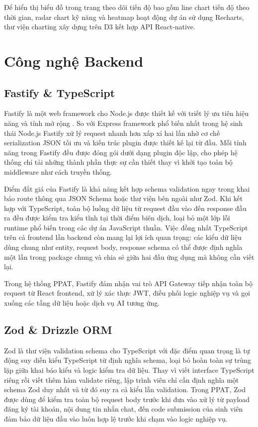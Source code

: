 \documentclass[../main.tex]{subfiles}
\begin{document}
Để hiển thị biểu đồ trong trang theo dõi tiến độ bao gồm line chart tiến độ theo thời gian, radar chart kỹ năng và heatmap hoạt động dự án sử dụng Recharts, thư viện charting xây dựng trên D3 kết hợp API React-native.

\section{Công nghệ Backend}

\subsection{Fastify \& TypeScript}

Fastify là một web framework cho Node.js được thiết kế với triết lý ưu tiên hiệu năng và tính mở rộng \cite{fastify2024docs}. So với Express framework phổ biến nhất trong hệ sinh thái Node.js Fastify xử lý request nhanh hơn xấp xỉ hai lần nhờ cơ chế serialization JSON tối ưu và kiến trúc plugin được thiết kế lại từ đầu. Mỗi tính năng trong Fastify đều được đóng gói dưới dạng plugin độc lập, cho phép hệ thống chỉ tải những thành phần thực sự cần thiết thay vì khởi tạo toàn bộ middleware như cách truyền thống.

Điểm đắt giá của Fastify là khả năng kết hợp schema validation ngay trong khai báo route thông qua JSON Schema hoặc thư viện bên ngoài như Zod. Khi kết hợp với TypeScript, toàn bộ luồng dữ liệu từ request đầu vào đến response đầu ra đều được kiểm tra kiểu tĩnh tại thời điểm biên dịch, loại bỏ một lớp lỗi runtime phổ biến trong các dự án JavaScript thuần. Việc đồng nhất TypeScript trên cả frontend lẫn backend còn mang lại lợi ích quan trọng: các kiểu dữ liệu dùng chung như entity, request body, response schema có thể được định nghĩa một lần trong package chung và chia sẻ giữa hai đầu ứng dụng mà không cần viết lại.

Trong hệ thống PPAT, Fastify đảm nhận vai trò API Gateway tiếp nhận toàn bộ request từ React frontend, xử lý xác thực JWT, điều phối logic nghiệp vụ và gọi xuống các tầng dữ liệu hoặc dịch vụ AI tương ứng.

\subsection{Zod \& Drizzle ORM}

Zod là thư viện validation schema cho TypeScript với đặc điểm quan trọng là tự động suy diễn kiểu TypeScript từ định nghĩa schema, loại bỏ hoàn toàn sự trùng lặp giữa khai báo kiểu và logic kiểm tra dữ liệu. Thay vì viết interface TypeScript riêng rồi viết thêm hàm validate riêng, lập trình viên chỉ cần định nghĩa một schema Zod duy nhất và từ đó suy ra cả kiểu lẫn validation. Trong PPAT, Zod được dùng để kiểm tra toàn bộ request body trước khi đưa vào xử lý từ payload đăng ký tài khoản, nội dung tin nhắn chat, đến code submission của sinh viên đảm bảo dữ liệu đầu vào luôn hợp lệ trước khi chạm vào logic nghiệp vụ.
\end{document}
